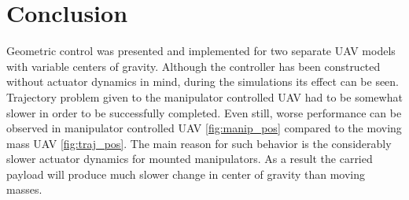 \section{Conclusion}

Geometric control was presented and implemented for two separate UAV models with variable centers of gravity. Although the controller has been constructed without actuator dynamics in mind, during the simulations its effect can be seen. Trajectory problem given to the manipulator controlled UAV had to be somewhat slower in order to be successfully completed. Even still, worse performance can be observed in manipulator controlled UAV \ref{fig:manip_pos} compared to the moving mass UAV \ref{fig:traj_pos}. The main reason for such behavior is the considerably slower actuator dynamics for mounted manipulators. As a result the carried payload will produce much slower change in center of gravity than moving masses. \\ 
